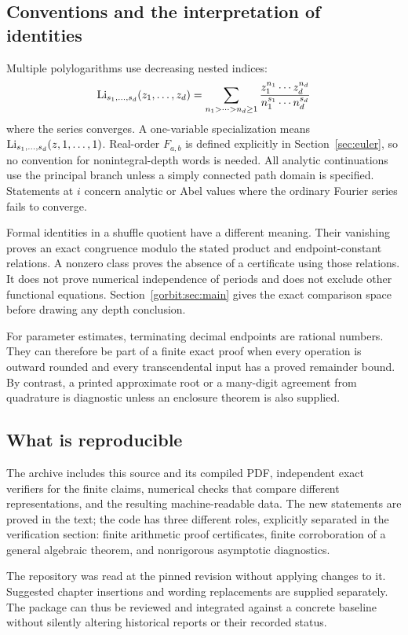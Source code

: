 \subsection{Conventions and the interpretation of identities}

Multiple polylogarithms use decreasing nested indices:
\[
 \operatorname{Li}_{s_1,\ldots,s_d}(z_1,\ldots,z_d)
 =\sum_{n_1>\cdots>n_d\geq1}
        \frac{z_1^{n_1}\cdots z_d^{n_d}}
             {n_1^{s_1}\cdots n_d^{s_d}}
\]
where the series converges. A one-variable specialization means
$\operatorname{Li}_{s_1,\ldots,s_d}(z,1,\ldots,1)$. Real-order $F_{a,b}$ is
defined explicitly in Section~\ref{sec:euler}, so no convention for
nonintegral-depth words is needed. All analytic continuations use the
principal branch unless a simply connected path domain is specified.
Statements at $i$ concern analytic or Abel values where the ordinary
Fourier series fails to converge.

Formal identities in a shuffle quotient have a different meaning.
Their vanishing proves an exact congruence modulo the stated product
and endpoint-constant relations. A nonzero class proves the absence
of a certificate using those relations. It does not prove numerical
independence of periods and does not exclude other functional
equations. Section~\ref{gorbit:sec:main} gives the exact comparison space
before drawing any depth conclusion.

For parameter estimates, terminating decimal endpoints are rational
numbers. They can therefore be part of a finite exact proof when
every operation is outward rounded and every transcendental input
has a proved remainder bound. By contrast, a printed approximate
root or a many-digit agreement from quadrature is diagnostic unless
an enclosure theorem is also supplied.

\subsection{What is reproducible}

The archive includes this source and its compiled PDF, independent
exact verifiers for the finite claims, numerical checks that compare
different representations, and the resulting machine-readable data.
The new statements are proved in the text; the code has three
different roles, explicitly separated in the verification section:
finite arithmetic proof certificates, finite corroboration of a
general algebraic theorem, and nonrigorous asymptotic diagnostics.

The repository was read at the pinned revision without applying
changes to it. Suggested chapter insertions and wording replacements
are supplied separately. The package can thus be reviewed and
integrated against a concrete baseline without silently altering
historical reports or their recorded status.
